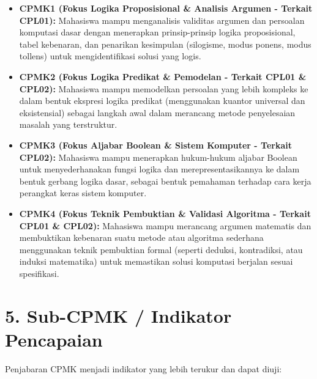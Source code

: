 \documentclass[12pt,a4paper]{article}
\begin{document}
\begin{itemize}[leftmargin=*]
  \item \textbf{CPMK1 (Fokus Logika Proposisional \& Analisis Argumen - Terkait CPL01):} Mahasiswa mampu menganalisis validitas argumen dan persoalan komputasi dasar dengan menerapkan prinsip-prinsip logika proposisional, tabel kebenaran, dan penarikan kesimpulan (silogisme, modus ponens, modus tollens) untuk mengidentifikasi solusi yang logis.
  
  \item \textbf{CPMK2 (Fokus Logika Predikat \& Pemodelan - Terkait CPL01 \& CPL02):} Mahasiswa mampu memodelkan persoalan yang lebih kompleks ke dalam bentuk ekspresi logika predikat (menggunakan kuantor universal dan eksistensial) sebagai langkah awal dalam merancang metode penyelesaian masalah yang terstruktur.
  
  \item \textbf{CPMK3 (Fokus Aljabar Boolean \& Sistem Komputer - Terkait CPL02):} Mahasiswa mampu menerapkan hukum-hukum aljabar Boolean untuk menyederhanakan fungsi logika dan merepresentasikannya ke dalam bentuk gerbang logika dasar, sebagai bentuk pemahaman terhadap cara kerja perangkat keras sistem komputer.
  
  \item \textbf{CPMK4 (Fokus Teknik Pembuktian \& Validasi Algoritma - Terkait CPL01 \& CPL02):} Mahasiswa mampu merancang argumen matematis dan membuktikan kebenaran suatu metode atau algoritma sederhana menggunakan teknik pembuktian formal (seperti deduksi, kontradiksi, atau induksi matematika) untuk memastikan solusi komputasi berjalan sesuai spesifikasi.
\end{itemize}

\vspace{0.5cm}

\section*{5. Sub-CPMK / Indikator Pencapaian}

Penjabaran CPMK menjadi indikator yang lebih terukur dan dapat diuji:
\end{document}

